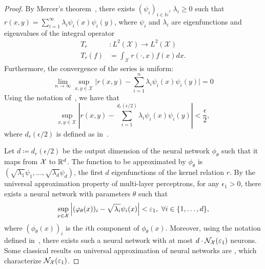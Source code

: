 \begin{proof}
	By Mercer's theorem~\parencite{mercerFunctionsPositive1909, sunMercerTheorem2005, micchelliUniversalKernels2006}, there exists \((\psi_i)_{i \in \mathbb{N}}\), \(\lambda_i \geq 0\) such that \(r(x,y) = \sum_{i=1}^{\infty}{\lambda_i \psi_i(x) \psi_i(y)}\), where \(\psi_i\) and \(\lambda_i\) are eigenfunctions and eigenvalues of the integral operator
	\begin{align*}
		T_r&: L^2(\mathcal{X}) \to L^2(\mathcal{X}) \\
		T_r(f) &= \int_{\mathcal{X}}{r(\cdot, x) f(x) dx}.
	\end{align*}
	Furthermore, the convergence of the series is uniform:
	\begin{equation}
		\lim_{n \to \infty} \sup_{x,y \in \mathcal{X}} \lvert r(x,y) - \sum_{i=1}^{n}{\lambda_i \psi_i(x) \psi_i(y) \rvert} = 0
	\end{equation}
	Using the notation of~, we have that
	\begin{equation}\label{eq:proof_mercer_thm_unif_abs_cv}
		\sup_{x,y \in \mathcal{X}} \left\lvert r(x,y) - \sum_{i=1}^{d_r(\epsilon/2)}{\lambda_i \psi_i(x) \psi_i(y)} \right\rvert < \frac{\epsilon}{2},
	\end{equation}
	where $d_r(\epsilon/2)$ is defined as in~.

	Let $d \coloneqq d_r(\epsilon / 2)$ be the output dimension of the neural network \(\phi_\theta\) such that it maps from ${\mathcal{X}}$ to $\mathbb{R}^d$. The function to be approximated by $\phi_\theta$ is \((\sqrt{\lambda_1} \psi_1, \ldots, \sqrt{\lambda_{d}} \psi_{d})\), the first $d$ eigenfunctions of the kernel relation $r$. By the universal approximation property of multi-layer perceptrons, for any \(\epsilon_1 > 0\), there exists a neural network with parameters \(\theta\) such that
	\begin{equation}\label{eq:proof_NN_UAP}
		\sup_{x\in \mathcal{X}}{\abs{(\phi_\theta(x))_i - \sqrt{\lambda_i} \psi_i(x)}} < \epsilon_1, \ \forall i \in \{1, \ldots, d\},
	\end{equation}
	where $(\phi_\theta(x))_i$ is the \(i\)th component of $\phi_\theta(x)$. Moreover, using the notation defined in~, there exists such a neural network with at most $d \cdot {\mathcal{N}}_{\mathcal{X}}(\varepsilon_1)$ neurons. Some classical results on universal approximation of neural networks are \parencite{hornikMultilayerFeedforward1989, cybenkoApproximationSuperpositions1989, barronUniversalApproximation1993}, which characterize ${\mathcal{N}}_{\mathcal{X}}(\varepsilon_1)$. 


\end{proof}
